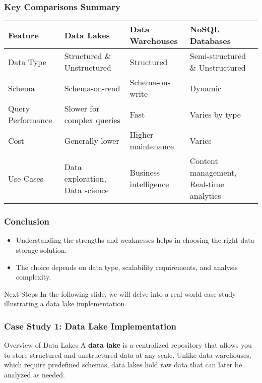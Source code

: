 \documentclass[aspectratio=169]{beamer}
\begin{document}
\begin{frame}[fragile]
    \frametitle{Key Comparisons Summary}
    \begin{table}[ht]
        \centering
        \begin{tabular}{|l|l|l|l|}
            \hline
            \textbf{Feature} & \textbf{Data Lakes} & \textbf{Data Warehouses} & \textbf{NoSQL Databases} \\ \hline
            Data Type & Structured \& Unstructured & Structured & Semi-structured \& Unstructured \\ \hline
            Schema & Schema-on-read & Schema-on-write & Dynamic \\ \hline
            Query Performance & Slower for complex queries & Fast & Varies by type \\ \hline
            Cost & Generally lower & Higher maintenance & Varies \\ \hline
            Use Cases & Data exploration, Data science & Business intelligence & Content management, Real-time analytics \\ \hline
        \end{tabular}
    \end{table}
\end{frame}

\begin{frame}[fragile]
    \frametitle{Conclusion}
    \begin{itemize}
        \item Understanding the strengths and weaknesses helps in choosing the right data storage solution.
        \item The choice depends on data type, scalability requirements, and analysis complexity.
    \end{itemize}
    \begin{block}{Next Steps}
        In the following slide, we will delve into a real-world case study illustrating a data lake implementation.
    \end{block}
\end{frame}

\begin{frame}[fragile]
    \frametitle{Case Study 1: Data Lake Implementation}
    \begin{block}{Overview of Data Lakes}
        A \textbf{data lake} is a centralized repository that allows you to store structured and unstructured data at any scale. Unlike data warehouses, which require predefined schemas, data lakes hold raw data that can later be analyzed as needed.
    \end{block}
\end{frame}
\end{document}
